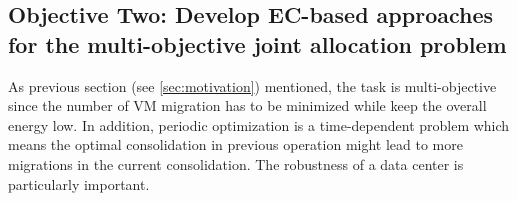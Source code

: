 \subsection{Objective Two: Develop EC-based approaches for the multi-objective joint allocation problem}

As previous section (see \ref{sec:motivation}) mentioned, the task is multi-objective since the number of VM migration has to be minimized while keep the overall energy low. In addition, periodic optimization is a time-dependent problem which means the optimal consolidation in previous operation might lead to more migrations in the current consolidation. The robustness of a data center is particularly important. 



